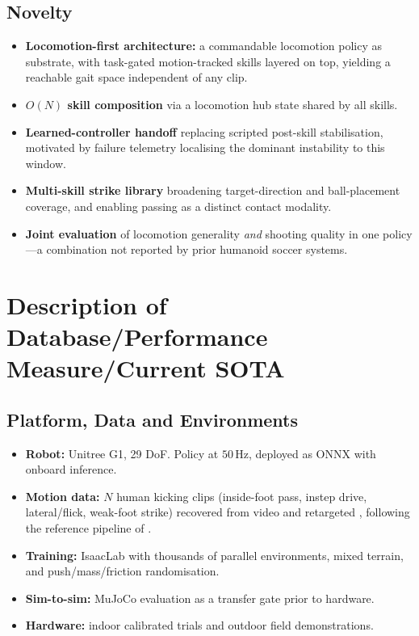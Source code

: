 \documentclass{article}
\begin{document}
\subsection*{Novelty}
\begin{itemize}
  \item \textbf{Locomotion-first architecture:} a commandable locomotion policy as substrate, with task-gated motion-tracked skills layered on top, yielding a reachable gait space independent of any clip.
  \item \textbf{$O(N)$ skill composition} via a locomotion hub state shared by all skills.
  \item \textbf{Learned-controller handoff} replacing scripted post-skill stabilisation, motivated by failure telemetry localising the dominant instability to this window.
  \item \textbf{Multi-skill strike library} broadening target-direction and ball-placement coverage, and enabling passing as a distinct contact modality.
  \item \textbf{Joint evaluation} of locomotion generality \emph{and} shooting quality in one policy---a combination not reported by prior humanoid soccer systems.
\end{itemize}

\section{Description of Database/Performance Measure/Current SOTA}

\subsection{Platform, Data and Environments}
\begin{itemize}
  \item \textbf{Robot:} Unitree G1, 29 DoF. Policy at $50$\,Hz, deployed as ONNX with onboard inference.
  \item \textbf{Motion data:} $N$ human kicking clips (inside-foot pass, instep drive, lateral/flick, weak-foot strike) recovered from video \citep{gvhmr} and retargeted \citep{gmr}, following the reference pipeline of \citep{robonaldo,beyondmimic}.
  \item \textbf{Training:} IsaacLab \citep{isaaclab} with thousands of parallel environments, mixed terrain, and push/mass/friction randomisation.
  \item \textbf{Sim-to-sim:} MuJoCo evaluation as a transfer gate prior to hardware.
  \item \textbf{Hardware:} indoor calibrated trials and outdoor field demonstrations.
\end{itemize}
\end{document}
